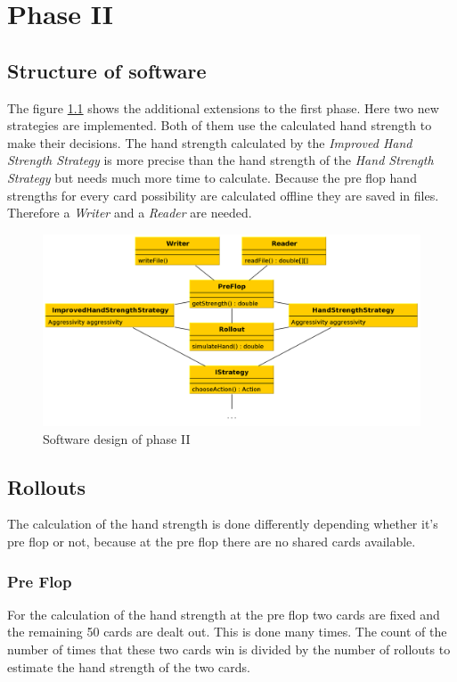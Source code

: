 \chapter{Phase II}

\section{Structure of software}
The figure \ref{fig:phase2} shows the additional extensions to the first phase. Here two new strategies are implemented. Both of them use the calculated hand strength to make their decisions. The hand strength calculated by the \emph{Improved Hand Strength Strategy} is more precise than the hand strength of the \emph{Hand Strength Strategy} but needs much more time to calculate. Because the pre flop hand strengths for every card possibility are calculated offline they are saved in files. Therefore a \emph{Writer} and a \emph{Reader} are needed.

\begin{figure}[h]
  \centering
  \includegraphics[width=1.0\textwidth]{images/phase2}
  \caption{Software design of phase II}
  \label{fig:phase2}
\end{figure}

\section{Rollouts}
The calculation of the hand strength is done differently depending whether it's pre flop or not, because at the pre flop there are no shared cards available.

\subsection{Pre Flop}
For the calculation of the hand strength at the pre flop two cards are fixed and the remaining 50 cards are dealt out. This is done many times. The count of the number of times that these two cards win is divided by the number of rollouts to estimate the hand strength of the two cards. 

